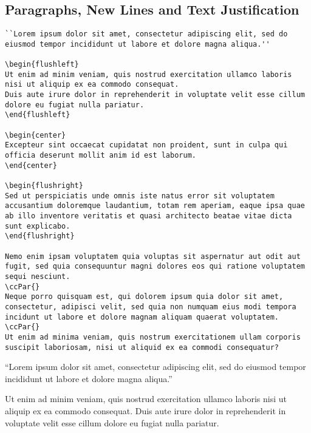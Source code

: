 \subsection*{Paragraphs, New Lines and Text Justification}%
\label{subsec:paragraphs-new-lines-and-text-justification}

\begin{lstlisting}[caption={Paragraphs, new lines and text justification.}]
``Lorem ipsum dolor sit amet, consectetur adipiscing elit, sed do eiusmod tempor incididunt ut labore et dolore magna aliqua.''

\begin{flushleft}
Ut enim ad minim veniam, quis nostrud exercitation ullamco laboris nisi ut aliquip ex ea commodo consequat.
Duis aute irure dolor in reprehenderit in voluptate velit esse cillum dolore eu fugiat nulla pariatur.
\end{flushleft}

\begin{center}
Excepteur sint occaecat cupidatat non proident, sunt in culpa qui officia deserunt mollit anim id est laborum.
\end{center}

\begin{flushright}
Sed ut perspiciatis unde omnis iste natus error sit voluptatem accusantium doloremque laudantium, totam rem aperiam, eaque ipsa quae ab illo inventore veritatis et quasi architecto beatae vitae dicta sunt explicabo.
\end{flushright}

Nemo enim ipsam voluptatem quia voluptas sit aspernatur aut odit aut fugit, sed quia consequuntur magni dolores eos qui ratione voluptatem sequi nesciunt.
\ccPar{}
Neque porro quisquam est, qui dolorem ipsum quia dolor sit amet, consectetur, adipisci velit, sed quia non numquam eius modi tempora incidunt ut labore et dolore magnam aliquam quaerat voluptatem.
\ccPar{}
Ut enim ad minima veniam, quis nostrum exercitationem ullam corporis suscipit laboriosam, nisi ut aliquid ex ea commodi consequatur?
\end{lstlisting}

``Lorem ipsum dolor sit amet, consectetur adipiscing elit, sed do eiusmod tempor incididunt ut labore et dolore magna aliqua.''

\begin{flushleft}
Ut enim ad minim veniam, quis nostrud exercitation ullamco laboris nisi ut aliquip ex ea commodo consequat.
Duis aute irure dolor in reprehenderit in voluptate velit esse cillum dolore eu fugiat nulla pariatur.
\end{flushleft}

